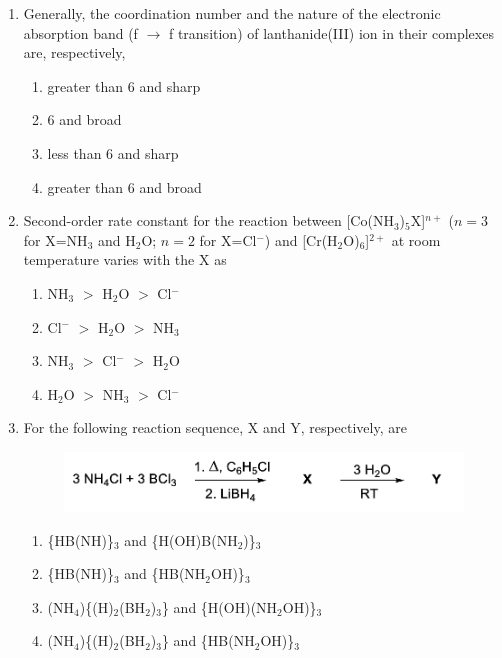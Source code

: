 \documentclass{article}
\begin{document}
\begin{enumerate}
\item Generally, the coordination number and the nature of the electronic absorption band 
(f $\rightarrow$ f transition) of lanthanide(III) ion in their complexes are, respectively,
\begin{multicols}{2}
\begin{enumerate}
    \item greater than 6 and sharp
    \item 6 and broad
    \item less than 6 and sharp
    \item greater than 6 and broad
\end{enumerate}
\end{multicols}

\item Second-order rate constant for the reaction between [Co(NH$_3$)$_5$X]$^{n+}$ 
($n=3$ for X=NH$_3$ and H$_2$O; $n=2$ for X=Cl$^-$) and [Cr(H$_2$O)$_6$]$^{2+}$ 
at room temperature varies with the X as
\begin{multicols}{2}
\begin{enumerate}
    \item NH$_3$ $>$ H$_2$O $>$ Cl$^-$
    \item Cl$^-$ $>$ H$_2$O $>$ NH$_3$
    \item NH$_3$ $>$ Cl$^-$ $>$ H$_2$O
    \item H$_2$O $>$ NH$_3$ $>$ Cl$^-$
\end{enumerate}
\end{multicols}

\item For the following reaction sequence, X and Y, respectively, are
\begin{figure}[H]
    \centering
    \includegraphics[width=0.5\columnwidth]{figures/cy_q39.png}
    \label{fig:placeholder}
\end{figure}
\begin{multicols}{2}
\begin{enumerate}
    \item \{HB(NH)\}$_3$ and \{H(OH)B(NH$_2$)\}$_3$
    \item \{HB(NH)\}$_3$ and \{HB(NH$_2$OH)\}$_3$
    \item (NH$_4$)\{(H)$_2$(BH$_2$)$_3$\} and \{H(OH)(NH$_2$OH)\}$_3$
    \item (NH$_4$)\{(H)$_2$(BH$_2$)$_3$\} and \{HB(NH$_2$OH)\}$_3$
\end{enumerate}
\end{multicols}


\end{enumerate}
\end{document}
